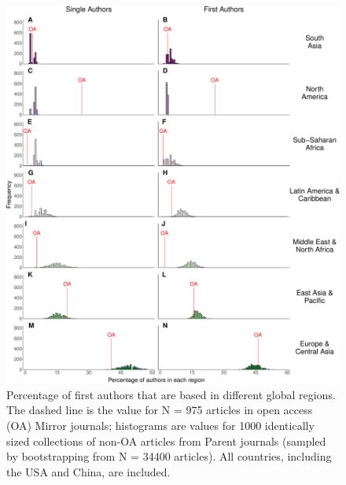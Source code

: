 \documentclass[
  english,
  man]{apa6}
\begin{document}
\begin{figure}

{\centering \includegraphics{Smith_etal_APC_ms_files/figure-latex/Fig5-1} 

}

\caption{Percentage of first authors that are based in different global regions. The dashed line is the value for N =  975  articles in open access (OA) Mirror journals; histograms are values for 1000 identically sized collections of non-OA articles from Parent journals (sampled by bootstrapping from N =  34400  articles). All countries, including the USA and China, are included.}\label{fig:Fig5}
\end{figure}
\end{document}
